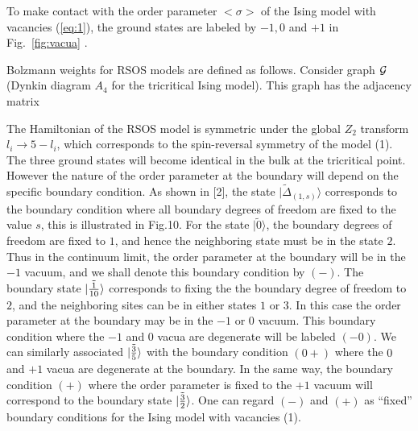 \documentclass[12pt]{article}
\begin{document}
To make contact with the order parameter $<\sigma>$ of the Ising model
with vacancies (\ref{eq:1}),  the ground states are labeled by $-1, 0$
and $+1$ in Fig.~\ref{fig:vacua} \cite{chim1996boundary}.

Bolzmann weights for RSOS models are defined as follows. Consider
graph ${\cal G}$ (Dynkin diagram $A_4$ for the tricritical Ising
model). This graph has the adjacency matrix 

The Hamiltonian of the RSOS model is symmetric under
the global $Z_2$ transform $l_i \to 5 - l_i$, which corresponds to the
spin-reversal symmetry of the model (1). The three ground states will
become identical in the bulk at the tricritical point. However the nature
of the order parameter at the boundary will depend on the specific boundary
condition. As shown in [2], the state $|\tilde{\Delta}_{(1,s)}\rangle$ corresponds
to the
boundary condition where all boundary degrees of freedom are fixed to the
value $s$, this is illustrated in Fig.10.
For the state $|\tilde{0}\rangle$, the boundary degrees of freedom are fixed to
$1$, and hence the neighboring state must be in the state $2$. Thus in
the continuum limit, the order parameter at the boundary will be in the $-1$
vacuum, and we shall denote this boundary condition by $(-)$. The boundary
state $|\tilde{1\over10}\rangle$ corresponds to fixing the the boundary degree
of freedom to $2$, and the neighboring sites can be in either states $1$ or
$3$. In this case the order parameter at the boundary may be in the $-1$ or
$0$ vacuum. This boundary condition where the $-1$ and $0$ vacua are
degenerate will be labeled $(-0)$.
We can similarly associated $|\tilde{3\over5}\rangle$ with the boundary condition
$(0+)$ where the $0$ and $+1$ vacua are degenerate at the boundary. In the
same way, the boundary condition $(+)$ where the order parameter is fixed to
the $+1$ vacuum will correspond to the boundary state $|\tilde{3\over2}\rangle$.
One can regard $(-)$ and $(+)$ as ``fixed'' boundary conditions for the
Ising model with vacancies (1).
\end{document}
